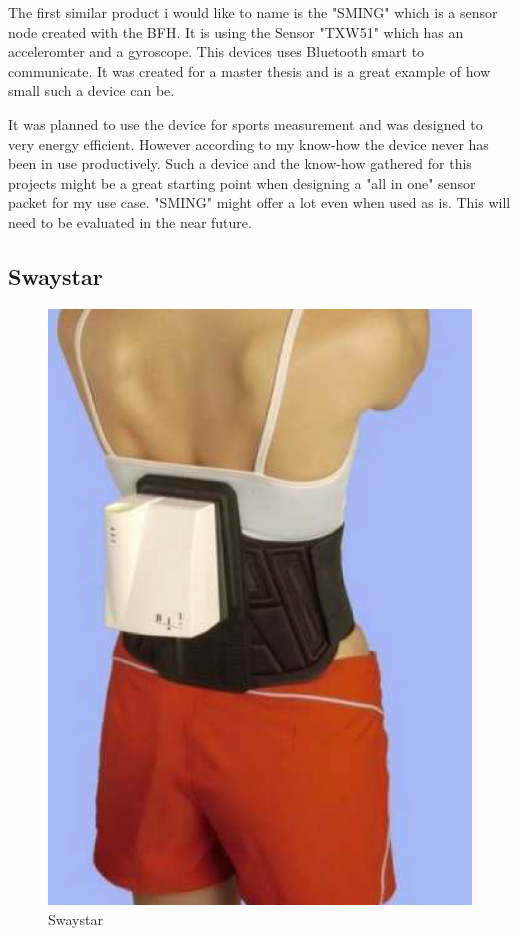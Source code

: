 The first similar product i would like to name is the "SMING" which is a sensor node created with the BFH. 
It is using the Sensor "TXW51" which has an acceleromter and a gyroscope. This devices uses Bluetooth smart to communicate. It was created for a master thesis and is a great example of how small such a device can be. 

It was planned to use the device for sports measurement and was designed to very energy efficient. However according to my know-how the device never has been in use productively. \cite{sming:book}
Such a device and the know-how gathered for this projects might be a great starting point when designing a "all in one" sensor packet for my use case. "SMING" might offer a lot even when used as is. This will need to be evaluated in the near future.

\subsection{Swaystar}

\begin{figure}
  \begin{center}
\includegraphics[width=\linewidth]{images/Swaystar_01.png}
  \end{center}
  \caption{\label{fig:swaystar}Swaystar}
\end{figure}

